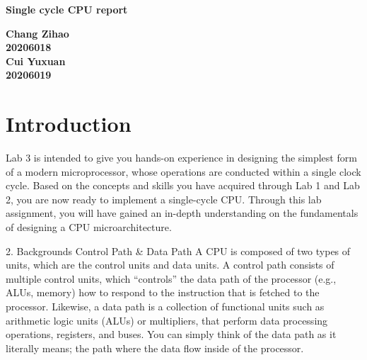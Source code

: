 \documentclass[12pt,a4paper]{article}
\begin{document}
\begin{titlepage}
  \begin{center}
    \vspace*{1cm}

    \textbf{\Huge Single cycle CPU  report}

    \vspace{0.5cm}

         
    \vspace{1.5cm}

    \textbf{\large Chang Zihao \\20206018\\\large Cui Yuxuan\\20206019}

    \vfill
         

         
    \vspace{0.8cm}
  


         
\end{center}
\end{titlepage}


\newpage
\tableofcontents
\thispagestyle{empty}

\newpage
{}
\setcounter{page}{1}

\section{Introduction}
Lab 3 is intended to give you hands-on experience in designing the simplest form of a modern microprocessor, whose operations are conducted within a single clock cycle. 
Based on the concepts and skills you have acquired through Lab 1 and Lab 2, you are now ready to implement a single-cycle CPU. 
Through this lab assignment, you will have gained an in-depth understanding on the fundamentals of designing a CPU microarchitecture.  
  
2. Backgrounds 
Control Path & Data Path 
A CPU is composed of two types of units, which are the control units and data units. 
A control path consists of multiple control units, which “controls” the data path of the processor (e.g., ALUs, memory) how to respond to the instruction that is fetched to the processor. 
Likewise, a data path is a collection of functional units such as arithmetic logic units (ALUs) or multipliers, that perform data processing operations, registers, and buses. 
You can simply think of the data path as it literally means; the path where the data flow inside of the processor. 
 
\end{document}
